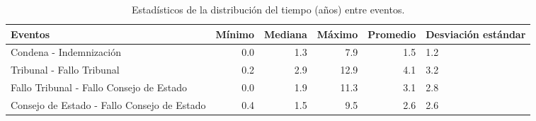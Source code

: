 \begin{table}[htbp]
\centering
\caption{Estadísticos de la distribución del
tiempo (años) entre eventos.} 
\label{tab:eventos-otros}
\begin{tabular}{p{4.5cm}rrrrR{2cm}}
  \hline
Eventos & Mínimo & Mediana & Máximo & Promedio & Desviación estándar \\ 
  \hline
Condena - Indemnización & 0.0 & 1.3 & 7.9 & 1.5 & 1.2 \\ 
  Tribunal - Fallo Tribunal & 0.2 & 2.9 & 12.9 & 4.1 & 3.2 \\ 
  Fallo Tribunal - Fallo Consejo de Estado & 0.0 & 1.9 & 11.3 & 3.1 & 2.8 \\ 
  Consejo de Estado - Fallo Consejo de Estado & 0.4 & 1.5 & 9.5 & 2.6 & 2.6 \\ 
   \hline
\end{tabular}
\end{table}
